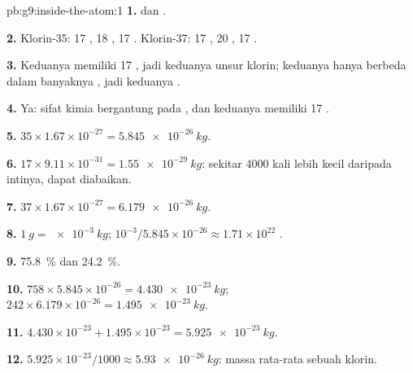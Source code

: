 \begin{solution}{pb:g9:inside-the-atom:1}
\textbf{1.}  dan .

\textbf{2.} Klorin-35: 17 , 18 , 17 .
Klorin-37: 17 , 20 , 17 .

\textbf{3.} Keduanya memiliki 17 , jadi keduanya unsur klorin;
keduanya hanya berbeda dalam banyaknya , jadi keduanya .

\textbf{4.} Ya: sifat kimia bergantung pada , dan keduanya
memiliki 17 .

\textbf{5.} $35 \times 1.67 \times 10^{-27} = \qty{5.845e-26}{kg}$.

\textbf{6.} $17 \times 9.11 \times 10^{-31} = \qty{1.55e-29}{kg}$:
sekitar 4000 kali lebih kecil daripada intinya, dapat diabaikan.

\textbf{7.} $37 \times 1.67 \times 10^{-27} = \qty{6.179e-26}{kg}$.

\textbf{8.} $\qty{1}{g} = \qty{e-3}{kg}$; $10^{-3} / 5.845 \times
10^{-26} \approx 1.71 \times 10^{22}$ .

\textbf{9.} \qty{75.8}{\percent} dan \qty{24.2}{\percent}.

\textbf{10.} $758 \times 5.845 \times 10^{-26} = \qty{4.430e-23}{kg}$;
$242 \times 6.179 \times 10^{-26} = \qty{1.495e-23}{kg}$.

\textbf{11.} $4.430 \times 10^{-23} + 1.495 \times 10^{-23} =
\qty{5.925e-23}{kg}$.

\textbf{12.} $5.925 \times 10^{-23} / 1000 \approx
\qty{5.93e-26}{kg}$: massa rata-rata sebuah  klorin.
\end{solution}
